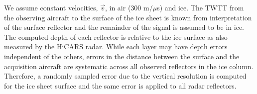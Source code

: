 
We assume constant velocities, $\vec{v}$, in air (300 m/${\mu}$s) and ice. The TWTT from the observing aircraft to the surface of the ice sheet is known from interpretation of the surface reflector and the remainder of the signal is assumed to be in ice. The computed depth of each reflector is relative to the ice surface as also measured by the HiCARS radar. While each layer may have depth errors independent of the others, errors in the distance between the surface and the acquisition aircraft are systematic across all observed reflectors in the ice column. Therefore, a randomly sampled error due to the vertical resolution is computed for the ice sheet surface and the same error is applied to all radar reflectors. 







